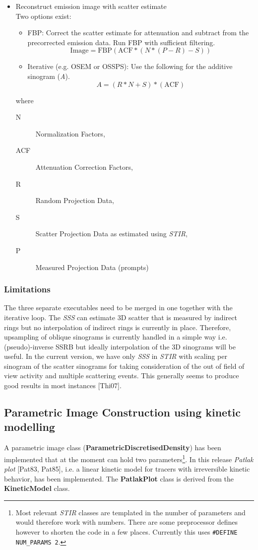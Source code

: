 \documentclass{article}
\begin{document}
\begin{itemize}
\item Reconstruct emission image with scatter estimate\\
Two options exist:
\begin{itemize}
\item	FBP: Correct the scatter estimate for attenuation and subtract from the precorrected emission data. 
Run FBP with sufficient filtering.
   \[\mathrm{Image} = \mathrm{FBP}\left(\mathrm{ACF}*(N*(P-R)-S)\right) \]
\item Iterative (e.g. OSEM or OSSPS): Use the following for the additive sinogram (\textit{A}).
    \[A=(R*N+S)*(\mathrm{ACF})  \]
\end{itemize}
where
  \begin{description}
   \item[N] Normalization Factors, 
   \item[ACF] Attenuation Correction Factors,
   \item[R] Random Projection Data,
   \item[S] Scatter Projection Data as estimated using  \textit{STIR},
   \item[P] Measured Projection Data (prompts)
  \end{description}
\end{itemize}

\subsubsection{Limitations}
The three separate executables need to be merged in one together with the iterative loop. The
\textit{SSS} can estimate 3D scatter that is measured by indirect rings but no interpolation of indirect
rings is currently in place. Therefore, upsampling of oblique sinograms is currently handled in a simple
way i.e. (pseudo)-inverse SSRB but ideally interpolation of the 3D sinograms will be useful. In the
current version, we have only \textit{SSS} in \textit{STIR} with scaling per sinogram of the scatter
sinograms for taking consideration of the out of field of view activity and multiple scattering
events. This generally seems to produce good results in most instances [Thi07].


\subsection{
Parametric Image Construction using kinetic modelling}
\label{sec:KineticModels}
A parametric image class (\textbf{ParametricDiscretisedDensity}) has been implemented that at the moment
can hold two parameters\footnote{Most relevant \textit{STIR} classes are templated in the number of parameters
and would therefore work with numbers. There are some preprocessor defines however to shorten the code in
a few places. Currently this uses \texttt{\#DEFINE NUM\_PARAMS 2}.}. 
In this release \textit{Patlak plot} [Pat83, Pat85], i.e. a linear kinetic
model for tracers with irreversible kinetic behavior, has been implemented. The \textbf{PatlakPlot} class
is derived from the \textbf{KineticModel} class.
\end{document}
